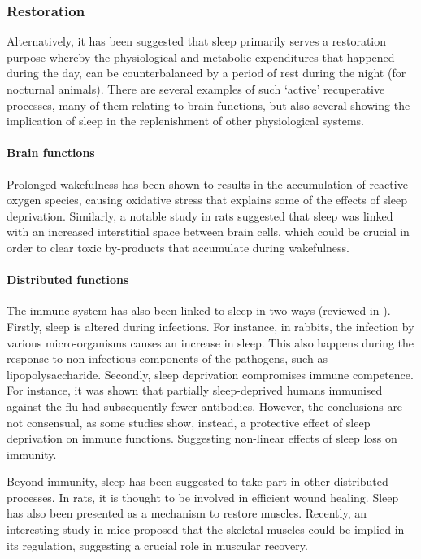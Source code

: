 \subsubsection{Restoration}
\label{sec:restoration}
Alternatively, it has been suggested that sleep primarily serves a restoration purpose whereby the physiological and metabolic expenditures that happened during the day, can be counterbalanced by a period of rest during the night\cite{adam_sleep_1980} (for nocturnal animals).
There are several examples of such `active' recuperative processes, many of them relating to brain functions, but also several showing the implication of sleep in the replenishment of other physiological systems.

\paragraph*{Brain functions}
Prolonged wakefulness has been shown to results in the accumulation of reactive oxygen species,
causing oxidative stress that explains some of the effects of sleep deprivation\cite{ramanathan_sleep_2002}.
Similarly, a notable study in rats suggested that sleep was linked with an increased interstitial space between brain cells, which could be crucial in order to clear toxic by-products that accumulate during wakefulness\cite{xie_sleep_2013}. 

\paragraph*{Distributed functions}
The immune system has also been linked to sleep in two ways (reviewed in \cite{bryant_sick_2004,imeri_how_2009}).
Firstly, sleep is altered during infections.
For instance, in rabbits, the infection by various micro-organisms causes an increase in sleep\cite{toth_alteration_1988}.
This also happens during the response to non-infectious components of the pathogens, such as lipopolysaccharide\cite{lancel_lipopolysaccharide_1995}.
Secondly, sleep deprivation compromises immune competence.
For instance, it was shown that partially sleep-deprived humans immunised against the flu had 
subsequently fewer antibodies\cite{spiegel_effect_2002}.
However, the conclusions are not consensual, as some studies show, instead, a protective effect of sleep deprivation on immune functions\cite{renegar_progression_2000}.
Suggesting non-linear effects of sleep loss on immunity\cite{bryant_sick_2004}.


Beyond immunity, sleep has been suggested to take part in other distributed processes.
In rats, it is thought to be involved in efficient wound healing\cite{gumustekin_effects_2004}.
Sleep has also been presented as a mechanism to restore muscles\cite{dattilo_sleep_2011}.
Recently, an interesting study in mice proposed that the skeletal muscles could be implied in its regulation, suggesting a crucial role in muscular recovery\cite{ehlen_bmal1_2017}.


